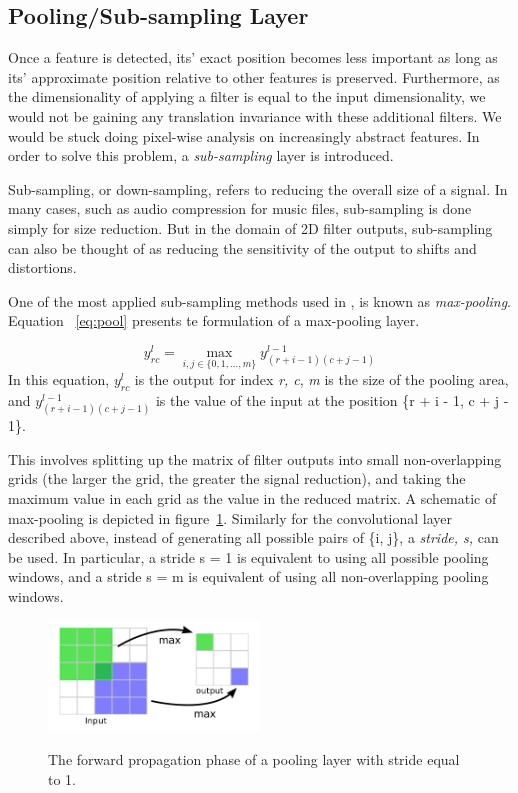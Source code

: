 \subsection{Pooling/Sub-sampling Layer}
\label{poolinglayer}
Once a feature is detected, its' exact position becomes less important as long as its' approximate position relative to other features is preserved. Furthermore, as the dimensionality of applying a filter is equal to the input dimensionality, we would not be gaining any translation invariance with these additional filters. We would be stuck doing pixel-wise analysis on increasingly abstract features. In order to solve this problem, a \textit{sub-sampling} layer is introduced.

 Sub-sampling, or down-sampling, refers to reducing the overall size of a signal. In many cases, such as audio compression for music files, sub-sampling is done simply for size reduction. But in the domain of 2D filter outputs, sub-sampling  can also be thought of as reducing the sensitivity of the output to shifts and distortions.

One of the most applied sub-sampling methods used in \cite{lecun1995comparison}, is known as \textit{max-pooling}. Equation ~\ref{eq:pool} presents te formulation of a max-pooling layer. 

\begin{equation}
y_{rc}^{l} =  \max_{i,j\in\{0,1,...,m\} }  y_{(r+i-1)(c+j-1)}^{l-1}
\label{eq:pool}
\end{equation}
In this equation, $y_{rc}^{l}$ is the output for index \textit{{r, c}}, \textit{m} is the size of the pooling area, and $y_{(r+i-1)(c+j-1)}^{l-1}$ is the value of the input at the position \{r + i - 1, c + j - 1\}.


 
This involves splitting up the matrix of filter outputs into small non-overlapping grids (the larger the grid, the greater the signal reduction), and taking the maximum value in each grid as the value in the reduced matrix. A schematic of max-pooling is depicted in figure~\ref{fig:pooling}. Similarly for the convolutional layer described above, instead of generating all possible pairs of \{i, j\}, a \textit{stride, s,} can be used. In particular, a stride s = 1 is equivalent to using all possible pooling windows, and a stride s = m is equivalent of using all non-overlapping pooling windows.
\begin{figure}[H]
	\centering
	{\includegraphics[width=0.5\textwidth]{images/pooling}}
	\caption{The forward propagation phase of a pooling layer with stride equal to 1.}
	\label{fig:pooling}
\end{figure}
 

